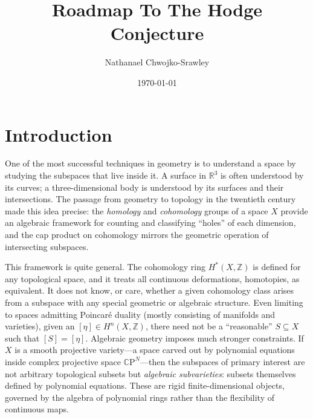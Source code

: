 \documentclass{article}
\title{Roadmap To The Hodge Conjecture}
\author{Nathanael Chwojko-Srawley}
\date{\today}
\renewcommand{\maketitle}{
    \quad
    \vspace{1em}
  \begin{center}
      \LARGE\bfseries \thetitle \par
      \vspace{0.6em}
      \large
  \end{center}
    \vspace{1em}
}
\newcommand{\R}{\mathbb{R}}
\newcommand{\Z}{{\mathbb{Z}}}
\newcommand{\CP}{\mathbb{C}\mathrm{P}}
\newcommand{\sse}{\subseteq}
\begin{document}
\maketitle
\tableofcontents

\section{Introduction}\label{sec:introduction}


One of the most successful techniques in geometry is to understand a space by studying
the subspaces that live inside it. A surface in $\R^3$ is often understood by
its curves; a three-dimensional body is understood by its surfaces and their
intersections. The passage from geometry to topology in the twentieth century
made this idea precise: the \emph{homology} and \emph{cohomology} groups of a
space $X$ provide an algebraic framework for counting and classifying ``holes''
of each dimension, and the cap product on cohomology mirrors the geometric
operation of intersecting subspaces.

This framework is quite general. The cohomology ring $H^*(X, \Z)$ is defined
for any topological space, and it treats all continuous deformations,
homotopies, as equivalent. It does not know, or care, whether a given
cohomology class arises from a subspace with any special geometric or algebraic
structure. Even limiting to spaces admitting Poincar\'{e} duality (mostly
consisting of manifolds and varieties), given an $[\eta] \in H^n(X,\Z)$, there
need not be a ``reasonable'' $S \sse X$ such that $[S] = [\eta]$. Algebraic
geometry imposes much stronger constraints. If $X$ is a smooth projective
variety---a space carved out by polynomial equations inside complex projective
space $\CP^N$---then the subspaces of primary interest are not arbitrary
topological subsets but \emph{algebraic subvarieties}: subsets themselves
defined by polynomial equations. These are rigid finite-dimensional objects,
governed by the algebra of polynomial rings rather than the flexibility of
continuous maps.
\end{document}
